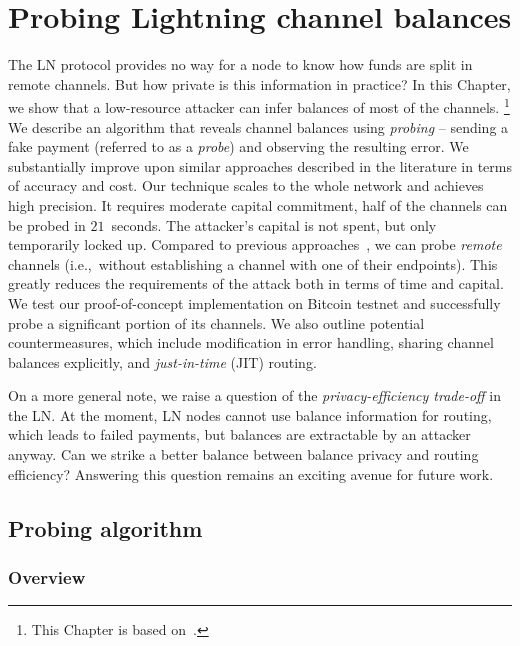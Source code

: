 \chapter{Probing Lightning channel balances}

\label{Chapter06LNprobing}

The LN protocol provides no way for a node to know how funds are split in remote channels.
But how private is this information in practice?
In this Chapter, we show that a low-resource attacker can infer balances of most of the channels.
\footnote{This Chapter is based on~\cite{Tikhomirov2020}.}
We describe an algorithm that reveals channel balances using \textit{probing} -- sending a fake payment (referred to as a \textit{probe}) and observing the resulting error.
We substantially improve upon similar approaches described in the literature in terms of accuracy and cost.
Our technique scales to the whole network and achieves high precision.
It requires moderate capital commitment, half of the channels can be probed in $21$~seconds.
The attacker's capital is not spent, but only temporarily locked up.
Compared to previous approaches~\cite{HerreraJoancomarti2019, Dam2019}, we can probe \textit{remote} channels (i.e.,~without establishing a channel with one of their endpoints).
This greatly reduces the requirements of the attack both in terms of time and capital.
We test our proof-of-concept implementation on Bitcoin testnet and successfully probe a significant portion of its channels.
We also outline potential countermeasures, which include modification in error handling, sharing channel balances explicitly, and \textit{just-in-time} (JIT) routing.

On a more general note, we raise a question of the \textit{privacy-efficiency trade-off} in the LN.
At the moment, LN nodes cannot use balance information for routing, which leads to failed payments, but balances are extractable by an attacker anyway.
Can we strike a better balance between balance privacy and routing efficiency?
Answering this question remains an exciting avenue for future work.


\section{Probing algorithm}
\label{sec:probing}

\subsection{Overview}

